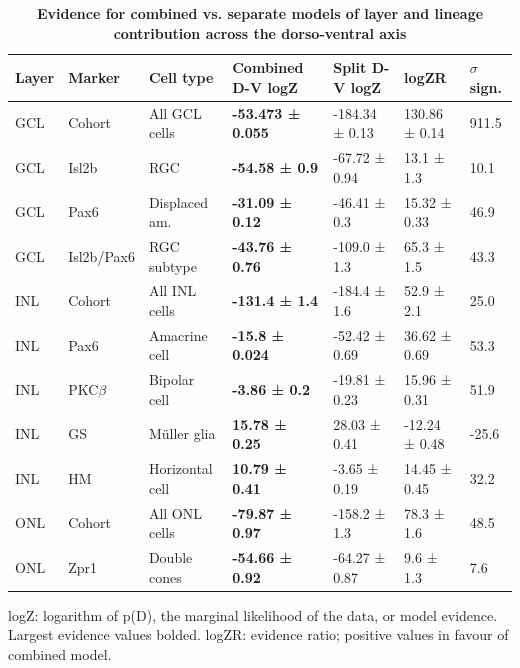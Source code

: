 \documentclass{ut-thesis}
\begin{document}
\begin{NoHyper}
\begin{table}[!ht]
    \caption{{\bf Evidence for combined vs. separate models of layer and lineage contribution across the dorso-ventral axis}}
    \begin{tabular}{|l|l|l|l|l|l|l|} 
        \hline
        {\bf Layer} & {\bf Marker} & {\bf Cell type} & {\bf Combined D-V logZ} & {\bf Split D-V logZ} & {\bf logZR} & {\bf $\sigma$ sign.}\\ \hline \hline
        GCL & Cohort & All GCL cells & {\bf -53.473 ± 0.055} & -184.34 ± 0.13 & 130.86 ± 0.14 & 911.5\\ \hline \hline
        GCL & Isl2b & RGC & {\bf -54.58 ± 0.9} & -67.72 ± 0.94 & 13.1 ± 1.3 & 10.1\\ \hline
        GCL & Pax6 & Displaced am. & {\bf -31.09 ± 0.12} & -46.41 ± 0.3 & 15.32 ± 0.33 & 46.9\\ \hline
        GCL & Isl2b/Pax6 & RGC subtype & {\bf -43.76 ± 0.76} & -109.0 ± 1.3 & 65.3 ± 1.5 & 43.3\\ \hline \hline
        INL & Cohort & All INL cells & {\bf -131.4 ± 1.4} & -184.4 ± 1.6 & 52.9 ± 2.1 & 25.0\\ \hline \hline
        INL & Pax6 & Amacrine cell & {\bf -15.8 ± 0.024} & -52.42 ± 0.69 & 36.62 ± 0.69 & 53.3\\ \hline
        INL & PKC$\beta$ & Bipolar cell & {\bf -3.86 ± 0.2} & -19.81 ± 0.23 & 15.96 ± 0.31 & 51.9\\ \hline
        INL & GS & M\"{u}ller glia & {\bf 15.78 ± 0.25} & 28.03 ± 0.41 & -12.24 ± 0.48 & -25.6\\ \hline
        INL & HM & Horizontal cell & {\bf 10.79 ± 0.41} & -3.65 ± 0.19 & 14.45 ± 0.45 & 32.2\\ \hline \hline
        ONL & Cohort & All ONL cells & {\bf -79.87 ± 0.97} & -158.2 ± 1.3 & 78.3 ± 1.6 & 48.5\\ \hline \hline
        ONL & Zpr1 & Double cones & {\bf -54.66 ± 0.92} & -64.27 ± 0.87 & 9.6 ± 1.3 & 7.6\\ \hline
    \end{tabular}
\begin{flushleft}logZ: logarithm of p(D), the marginal likelihood of the data, or model evidence.  Largest evidence values bolded. logZR: evidence ratio; positive values in favour of combined model.
\end{flushleft}
\label{lineage_dvev}
\end{table}


\end{NoHyper}
\end{document}
